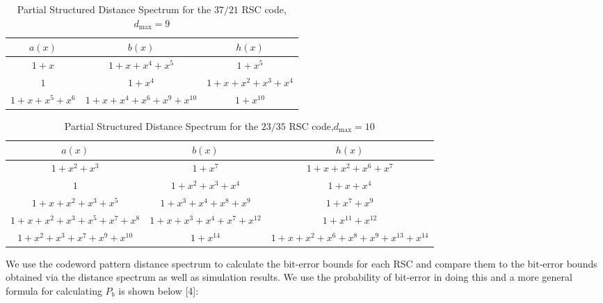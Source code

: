 \begin{table*}[h!]
 \caption{Partial Structured Distance Spectrum for the $37/21$ RSC code,$d_{\text{max}}=9$}
\centering
 \begin{tabular}{c c c} 
 \hline
 $a(x)$ & $b(x)$ & $h(x)$ \\ [0.5ex] 
 \hline\hline
$1+x$ & $1+x+x^{4}+x^5$ & $1+x^5$\\
\hline
$1$ & $1+x^4$ & $1+x+x^2+x^3+x^4$\\
\hline
$1+x+x^5+x^6$ & $1+x+x^4+x^6+x^9+x^{10}$ & $1+x^{10}$\\
 \end{tabular}
 
 \label{novelTab14}
\end{table*}

\begin{table*}[h!]
 \caption{Partial Structured Distance Spectrum for the $23/35$ RSC code,$d_{\text{max}}=10$}
\centering
 \begin{tabular}{c c c} 
 \hline
 $a(x)$ & $b(x)$ & $h(x)$ \\ [0.5ex] 
 \hline\hline
$1+x^2+x^3$ & $1+x^7$ & $1+x+x^2+x^6+x^7$\\
\hline
$1$ & $1+x^2+x^3+x^4$ & $1+x+x^{4}$\\
\hline
$1+x+x^2+x^3+x^5$ & $1+x^3+x^4+x^8+x^9$ & $1+x^7+x^9$\\
\hline
$1+x+x^2+x^3+x^5+x^7+x^8$ & $1+x+x^3+x^4+x^7+x^{12}$ & $1+x^{11}+x^{12}$\\
\hline
$1+x^2+x^3+x^7+x^9+x^{10}$ & $1+x^{14}$ & $1+x+x^2+x^6+x^8+x^9+x^{13}+x^{14}$\\
 \end{tabular}
 
 \label{novelTab15}
\end{table*}
We use the codeword pattern distance spectrum to calculate the bit-error bounds for each RSC and compare them to the bit-error bounds obtained via the distance spectrum as well as simulation results. We use the probability of bit-error in doing this and a more general formula for calculating $P_b$ is shown below [4]:

